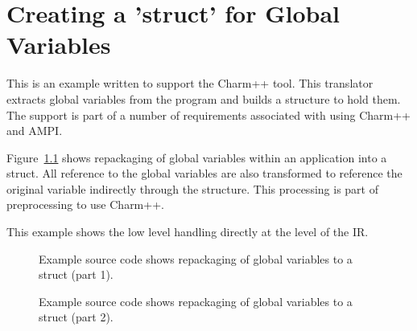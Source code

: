 \chapter{Creating a 'struct' for Global Variables}

   This is an example written to support the Charm++ tool. This translator
extracts global variables from the program and builds a structure to hold them.
The support is part of a number of requirements associated with using Charm++
and AMPI.

   Figure~\ref{Tutorial:exampleGlobalVariableHandling} shows repackaging of global
variables within an application into a struct. All reference to the global variables
are also transformed to reference the original variable indirectly through the structure.
This processing is part of preprocessing to use Charm++.  

   This example shows the low level handling directly at the level of the IR.

\begin{figure}[!h]
{\indent
{\mySmallestFontSize


\begin{latexonly}
%  
   
\end{latexonly}

\begin{htmlonly}
   
\end{htmlonly}

}
}
\caption{Example source code shows repackaging of global variables to a struct (part 1).}
\label{Tutorial:exampleGlobalVariableHandling}
\end{figure}

\begin{figure}[!h]
{\indent
{\mySmallestFontSize


\begin{latexonly}
   
\end{latexonly}

\begin{htmlonly}
%   
\end{htmlonly}

}
}
\caption{Example source code shows repackaging of global variables to a struct (part 2).}
\label{Tutorial:exampleGlobalVariableHandling2}
\end{figure}

